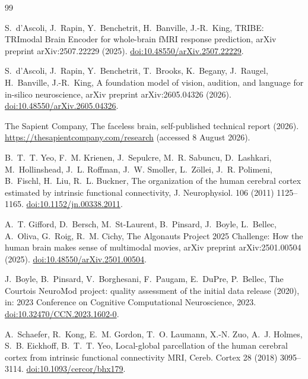 \documentclass[preprint,12pt]{elsarticle}
\begin{document}
\begin{thebibliography}{99}

S.~d'Ascoli, J.~Rapin, Y.~Benchetrit, H.~Banville, J.-R.~King, TRIBE: TRImodal Brain Encoder
for whole-brain fMRI response prediction, arXiv preprint arXiv:2507.22229 (2025).
\href{https://doi.org/10.48550/arXiv.2507.22229}{doi:10.48550/arXiv.2507.22229}.

S.~d'Ascoli, J.~Rapin, Y.~Benchetrit, T.~Brooks, K.~Begany, J.~Raugel, H.~Banville,
J.-R.~King, A foundation model of vision, audition, and language for in-silico neuroscience,
arXiv preprint arXiv:2605.04326 (2026).
\href{https://doi.org/10.48550/arXiv.2605.04326}{doi:10.48550/arXiv.2605.04326}.

The Sapient Company, The faceless brain, self-published technical report (2026).
\url{https://thesapientcompany.com/research} (accessed 8 August 2026).

B.~T.~T. Yeo, F.~M. Krienen, J.~Sepulcre, M.~R. Sabuncu, D.~Lashkari, M.~Hollinshead,
J.~L. Roffman, J.~W. Smoller, L.~Z\"ollei, J.~R. Polimeni, B.~Fischl, H.~Liu, R.~L. Buckner,
The organization of the human cerebral cortex estimated by intrinsic functional connectivity,
J. Neurophysiol. 106 (2011) 1125--1165.
\href{https://doi.org/10.1152/jn.00338.2011}{doi:10.1152/jn.00338.2011}.

A.~T. Gifford, D.~Bersch, M.~St-Laurent, B.~Pinsard, J.~Boyle, L.~Bellec, A.~Oliva, G.~Roig,
R.~M. Cichy, The Algonauts Project 2025 Challenge: How the human brain makes sense of
multimodal movies, arXiv preprint arXiv:2501.00504 (2025).
\href{https://doi.org/10.48550/arXiv.2501.00504}{doi:10.48550/arXiv.2501.00504}.

J.~Boyle, B.~Pinsard, V.~Borghesani, F.~Paugam, E.~DuPre, P.~Bellec, The Courtois NeuroMod
project: quality assessment of the initial data release (2020), in: 2023 Conference on
Cognitive Computational Neuroscience, 2023.
\href{https://doi.org/10.32470/CCN.2023.1602-0}{doi:10.32470/CCN.2023.1602-0}.

A.~Schaefer, R.~Kong, E.~M. Gordon, T.~O. Laumann, X.-N. Zuo, A.~J. Holmes, S.~B. Eickhoff,
B.~T.~T. Yeo, Local-global parcellation of the human cerebral cortex from intrinsic functional
connectivity MRI, Cereb. Cortex 28 (2018) 3095--3114.
\href{https://doi.org/10.1093/cercor/bhx179}{doi:10.1093/cercor/bhx179}.


\end{thebibliography}
\end{document}
